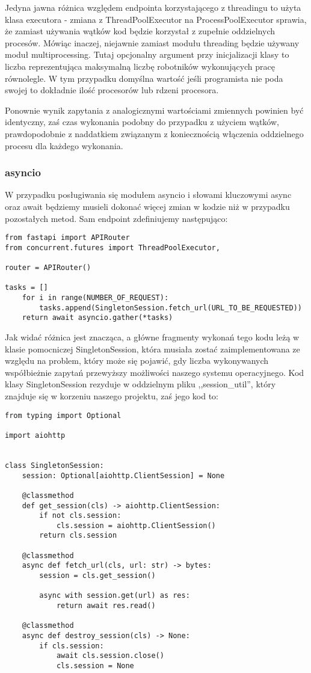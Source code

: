 Jedyna jawna różnica względem endpointa korzystającego z threadingu to użyta klasa executora - zmiana z ThreadPoolExecutor na ProcessPoolExecutor sprawia, że zamiast używania wątków kod będzie korzystał z zupełnie oddzielnych procesów. Mówiąc inaczej, niejawnie zamiast modułu threading będzie używany moduł multiprocessing. Tutaj opcjonalny argument przy inicjalizacji klasy to liczba reprezentująca maksymalną liczbę robotników wykonujących pracę równolegle. W tym przypadku domyślna wartość jeśli programista nie poda swojej to dokładnie ilość procesorów lub rdzeni procesora.

Ponownie wynik zapytania z analogicznymi wartościami zmiennych powinien być identyczny, zaś czas wykonania podobny do przypadku z użyciem wątków, prawdopodobnie z naddatkiem związanym z koniecznością włączenia oddzielnego procesu dla każdego wykonania.

\subsubsection{asyncio}
W przypadku posługiwania się modułem asyncio i słowami kluczowymi async oraz await będziemy musieli dokonać więcej zmian w kodzie niż w przypadku pozostałych metod. Sam endpoint zdefiniujemy następująco:
\begin{lstlisting}
from fastapi import APIRouter
from concurrent.futures import ThreadPoolExecutor,

router = APIRouter()

tasks = []
    for i in range(NUMBER_OF_REQUEST):
        tasks.append(SingletonSession.fetch_url(URL_TO_BE_REQUESTED))
    return await asyncio.gather(*tasks)
\end{lstlisting}
Jak widać różnica jest znacząca, a główne fragmenty wykonań tego kodu leżą w klasie pomocniczej SingletonSession, która musiała zostać zaimplementowana ze względu na problem, który może się pojawić, gdy liczba wykonywanych współbieżnie zapytań przewyższy możliwości naszego systemu operacyjnego. Kod klasy SingletonSession rezyduje w oddzielnym pliku ,,session\_util'', który znajduje się w korzeniu naszego projektu, zaś jego kod to:
\begin{lstlisting}
from typing import Optional

import aiohttp


class SingletonSession:
    session: Optional[aiohttp.ClientSession] = None

    @classmethod
    def get_session(cls) -> aiohttp.ClientSession:
        if not cls.session:
            cls.session = aiohttp.ClientSession()
        return cls.session

    @classmethod
    async def fetch_url(cls, url: str) -> bytes:
        session = cls.get_session()

        async with session.get(url) as res:
            return await res.read()

    @classmethod
    async def destroy_session(cls) -> None:
        if cls.session:
            await cls.session.close()
            cls.session = None

\end{lstlisting}

